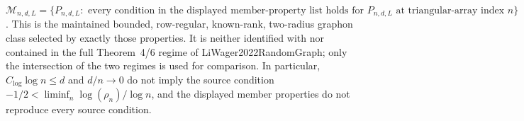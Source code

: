 \(\mathcal M_{n,d,L}=\{P_{n,d,L}:\text{ every condition in the displayed member-property list holds for }P_{n,d,L}\text{ at triangular-array index }n\}\).  This is the maintained bounded, row-regular, known-rank, two-radius graphon class selected by exactly those properties.  It is neither identified with nor contained in the full Theorem~4/6 regime of LiWager2022RandomGraph; only the intersection of the two regimes is used for comparison.  In particular, \(C_{\log}\log n\leq d\) and \(d/n\to0\) do not imply the source condition \(-1/2<\liminf_n\log(\rho_n)/\log n\), and the displayed member properties do not reproduce every source condition.
